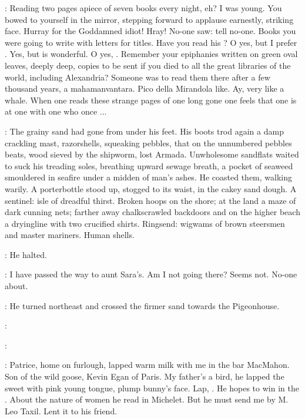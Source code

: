 \StephenInt:
Reading two pages apiece of seven books every night, eh?
I was young.
You bowed to yourself in the mirror,
stepping forward to applause earnestly, striking face.
Hurray for the Goddamned idiot!
Hray!
No-one saw:
tell no-one.
Books you were going to write with letters for titles.
Have you read his ?
O yes, but I prefer .
Yes, but  is wonderful.
O yes, .
Remember your epiphanies written on green oval leaves,
deeply deep,
copies to be sent if you died to all the great libraries of the world,
including Alexandria?
Someone was to read them there after a few thousand years,
a mahamanvantara.
Pico della Mirandola like.
Ay, very like a whale.
When one reads these strange pages of one long gone
one feels that one is at one with one who once ...

:
The grainy sand had gone from under his feet.
His boots trod again a damp crackling mast,
razorshells, squeaking pebbles,
that on the unnumbered pebbles beats,
wood sieved by the shipworm,
lost Armada.
Unwholesome sandflats waited to suck his treading soles,
breathing upward sewage breath,
a pocket of seaweed smouldered in seafire under a midden of man's ashes.
He coasted them, walking warily.
A porterbottle stood up,
stogged to its waist, in the cakey sand dough.
A sentinel:
isle of dreadful thirst.
Broken hoops on the shore;
at the land a maze of dark cunning nets;
farther away chalkscrawled backdoors
and on the higher beach
a dryingline with two crucified shirts.
Ringsend:
wigwams of brown steersmen and master mariners.
Human shells.

:
He halted.

\StephenInt:
I have passed the way to aunt Sara's.
Am I not going there?
Seems not.
No-one about.

:
He turned northeast and crossed the firmer sand towards the Pigeonhouse.

\patrice:

\Stephen:

\StephenInt:
Patrice, home on furlough, lapped warm milk with me in the bar MacMahon.
Son of the wild goose, Kevin Egan of Paris.
My father's a bird,
he lapped the sweet  with pink young tongue,
plump bunny's face.
Lap, .
He hopes to win in the .
About the nature of women he read in Michelet.
But he must send me  by M. Leo Taxil.
Lent it to his friend.

